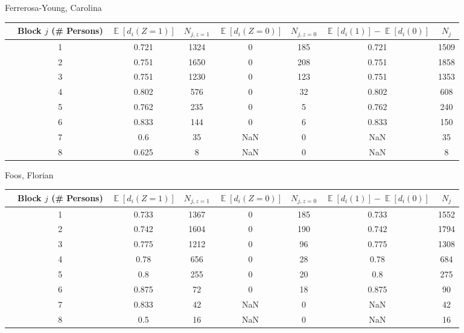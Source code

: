 \documentclass[11pt,notitlepage]{article}
\def\E{\mathop{\mathbb{E}}}
\begin{document}
Ferrerosa-Young, Carolina
\begin{table}[h!]\small
\begin{center}
\begin{tabular}{rc|cc|cc|cc}
  \hline
 & Block $j$ (\# Persons) & $\E[d_i(Z=1)]$ & $N_{j, z=1}$ & $\E[d_i(Z=0)]$ & $N_{j, z=0}$ & $\E[d_i(1)]-\E[d_i(0)]$ & $N_j$ \\ 
  \hline
 & 1 & 0.721 & 1324 & 0 & 185 & 0.721 & 1509 \\ 
 & 2 & 0.751 & 1650 & 0 & 208 & 0.751 & 1858 \\ 
 & 3 & 0.751 & 1230 & 0 & 123 & 0.751 & 1353 \\ 
 & 4 & 0.802 & 576 & 0 & 32 & 0.802 & 608 \\ 
 & 5 & 0.762 & 235 & 0 & 5 & 0.762 & 240 \\ 
 & 6 & 0.833 & 144 & 0 & 6 & 0.833 & 150 \\ 
 & 7 & 0.6 & 35 & NaN & 0 & NaN & 35 \\ 
 & 8 & 0.625 & 8 & NaN & 0 & NaN & 8 \\ 
   \hline
\end{tabular}
\end{center}
\end{table}


Foos, Florian
\begin{table}[h!]\small
\begin{center}
\begin{tabular}{rc|cc|cc|cc}
  \hline
 & Block $j$ (\# Persons) & $\E[d_i(Z=1)]$ & $N_{j, z=1}$ & $\E[d_i(Z=0)]$ & $N_{j, z=0}$ & $\E[d_i(1)]-\E[d_i(0)]$ & $N_j$ \\ 
  \hline
 & 1 & 0.733 & 1367 & 0 & 185 & 0.733 & 1552 \\ 
 & 2 & 0.742 & 1604 & 0 & 190 & 0.742 & 1794 \\ 
 & 3 & 0.775 & 1212 & 0 & 96 & 0.775 & 1308 \\ 
 & 4 & 0.78 & 656 & 0 & 28 & 0.78 & 684 \\ 
 & 5 & 0.8 & 255 & 0 & 20 & 0.8 & 275 \\ 
 & 6 & 0.875 & 72 & 0 & 18 & 0.875 & 90 \\ 
 & 7 & 0.833 & 42 & NaN & 0 & NaN & 42 \\ 
 & 8 & 0.5 & 16 & NaN & 0 & NaN & 16 \\ 
   \hline
\end{tabular}
\end{center}
\end{table}
\end{document}
